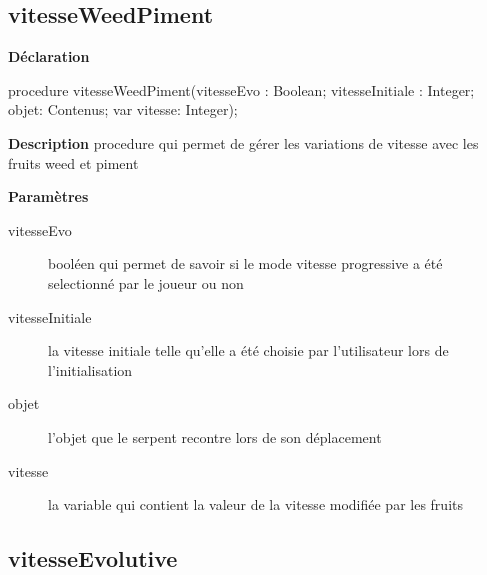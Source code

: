 \documentclass{report}
\newif\ifpdf
\begin{document}
\subsection*{vitesseWeedPiment}
\fi
\label{Jouer-vitesseWeedPiment}
\begin{list}{}{
\setlength{\itemindent}{0cm}
\setlength{\listparindent}{0cm}
\setlength{\leftmargin}{\evensidemargin}
\addtolength{\leftmargin}{\tmplength}
\settowidth{\labelsep}{X}
\addtolength{\leftmargin}{\labelsep}
\setlength{\labelwidth}{\tmplength}
}
\item[\textbf{Déclaration}\hfill]
\ifpdf
\begin{flushleft}
\fi
\begin{ttfamily}
procedure vitesseWeedPiment(vitesseEvo : Boolean; vitesseInitiale : Integer; objet: Contenus; var vitesse: Integer);\end{ttfamily}

\ifpdf
\end{flushleft}
\fi

\par
\item[\textbf{Description}]
procedure qui permet de gérer les variations de vitesse avec les fruits weed et piment    \par
\item[\textbf{Paramètres}]
\begin{description}
\item[vitesseEvo] booléen qui permet de savoir si le mode vitesse progressive a été selectionné par le joueur ou non
\item[vitesseInitiale] la vitesse initiale telle qu'elle a été choisie par l'utilisateur lors de l'initialisation
\item[objet] l'objet que le serpent recontre lors de son déplacement
\item[vitesse] la variable qui contient la valeur de la vitesse modifiée par les fruits
\end{description}


\end{list}
\ifpdf
\subsection*{\large{\textbf{vitesseEvolutive}}\normalsize\hspace{1ex}\hrulefill}
\else
\end{document}

